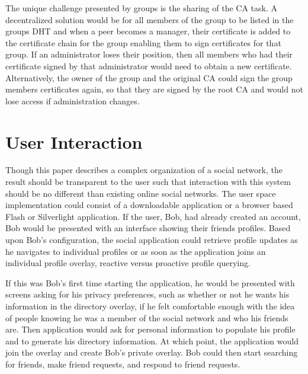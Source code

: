 \documentclass[conference]{IEEEtran}
\begin{document}
The unique challenge presented by groups is the sharing of the CA task.  A
decentralized solution would be for all members of the group to be listed in
the groups DHT and when a peer becomes a manager, their certificate is added
to the certificate chain for the group enabling them to sign certificates for
that group.  If an administrator loses their position, then all members who
had their certificate signed by that administrator would need to obtain a new
certificate.  Alternatively, the owner of the group and the original CA could
sign the group members certificates again, so that they are signed by the root
CA and would not lose access if administration changes.

\section{User Interaction}
\label{user_interaction}

Though this paper describes a complex organization of a social network, the
result should be transparent to the user such that interaction with this system
should be no different than existing online social networks.  The user space
implementation could consist of a downloadable application or a browser based
Flash or Silverlight application.  If the user, Bob, had already created an
account, Bob would be presented with an interface showing their friends
profiles.  Based upon Bob's configuration, the social application could
retrieve profile updates as he navigates to individual profiles or as soon as
the application joins an individual profile overlay, reactive versus proactive
profile querying.  

If this was Bob's first time starting the application, he would be presented
with screens asking for his privacy preferences, such as whether or not he
wants his information in the directory overlay, if he felt comfortable enough
with the idea of people knowing he was a member of the social network and who
his friends are.  Then application would ask for personal information to
populate his profile and to generate his directory information.  At which
point, the application would join the overlay and create Bob's private overlay.
Bob could then start searching for friends, make friend requests, and respond
to friend requests.
\end{document}
